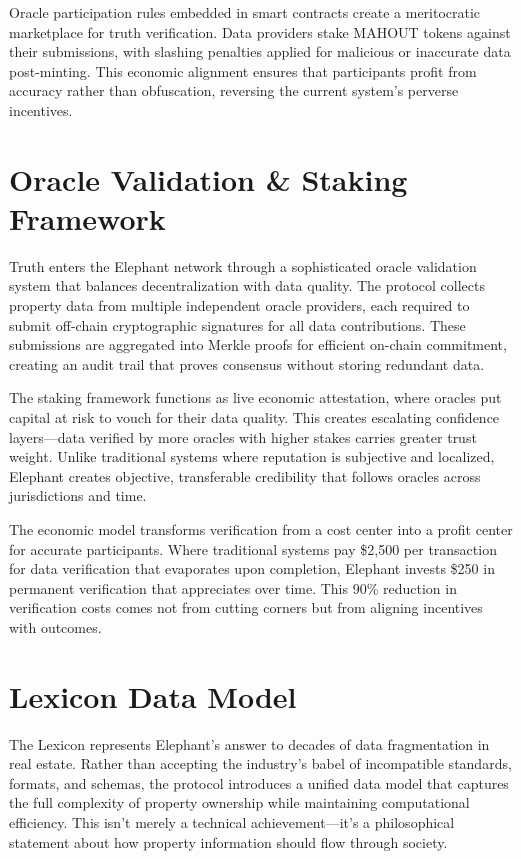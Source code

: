 Oracle participation rules embedded in smart contracts create a meritocratic marketplace for truth verification. Data providers stake MAHOUT tokens against their submissions, with slashing penalties applied for malicious or inaccurate data post-minting. This economic alignment ensures that participants profit from accuracy rather than obfuscation, reversing the current system's perverse incentives.

\section{Oracle Validation \& Staking Framework}

Truth enters the Elephant network through a sophisticated oracle validation system that balances decentralization with data quality. The protocol collects property data from multiple independent oracle providers, each required to submit off-chain cryptographic signatures for all data contributions. These submissions are aggregated into Merkle proofs for efficient on-chain commitment, creating an audit trail that proves consensus without storing redundant data.

The staking framework functions as live economic attestation, where oracles put capital at risk to vouch for their data quality. This creates escalating confidence layers—data verified by more oracles with higher stakes carries greater trust weight. Unlike traditional systems where reputation is subjective and localized, Elephant creates objective, transferable credibility that follows oracles across jurisdictions and time.

The economic model transforms verification from a cost center into a profit center for accurate participants. Where traditional systems pay \$2,500 per transaction for data verification that evaporates upon completion, Elephant invests \$250 in permanent verification that appreciates over time. This 90\% reduction in verification costs comes not from cutting corners but from aligning incentives with outcomes.

\section{Lexicon Data Model}

The Lexicon represents Elephant's answer to decades of data fragmentation in real estate. Rather than accepting the industry's babel of incompatible standards, formats, and schemas, the protocol introduces a unified data model that captures the full complexity of property ownership while maintaining computational efficiency. This isn't merely a technical achievement—it's a philosophical statement about how property information should flow through society.

